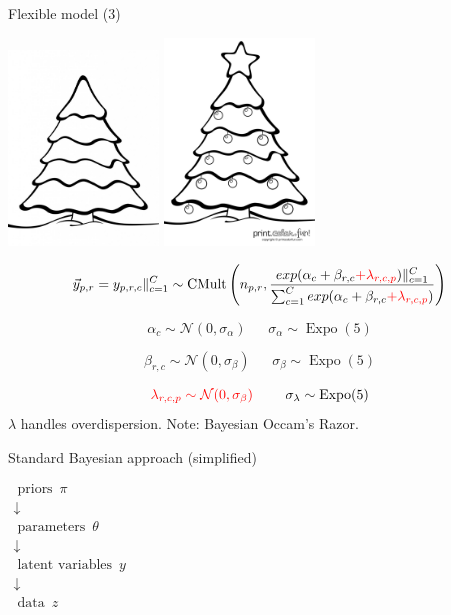 \documentclass[ignorenonframetext,]{beamer}
\newcommand{\red}[1]{\textcolor{red}{#1}}
\begin{document}
\begin{frame}{Flexible model (3)}

\includegraphics[width=0.30000\textwidth]{holidaytree_bare.jpg}
\includegraphics[width=0.30000\textwidth]{holidaytree_decorated.png}

\[\vec{y}_{p,r}=y_{p,r,c}\Vert_{c=1}^C\sim \operatorname{CMult}\left(n_{p,r},\frac{exp(\alpha_c+\beta_{r,c}\red{+\lambda_{r,c,p}})\Vert_{c=1}^C}{\sum_{c=1}^Cexp(\alpha_c+\beta_{r,c}\red{+\lambda_{r,c,p}})}\right)\]

\[\alpha_c\sim\mathcal{N}(0,\sigma_\alpha)~~~~~~~\sigma_\alpha\sim\operatorname{Expo}(5)\]

\[\beta_{r,c}\sim\mathcal{N}(0,\sigma_\beta)~~~~~~~\sigma_\beta\sim\operatorname{Expo}(5)\]

\[\red{\lambda_{r,c,p}\sim\mathcal{N}(0,\sigma_\beta)}~~~~~~~\sigma_\lambda\sim\operatorname{Expo}(5)\]
\(\lambda\) handles overdispersion. Note: Bayesian Occam's Razor.

\end{frame}

\begin{frame}{Standard Bayesian approach (simplified)}

\(\begin{array}{cl} \operatorname{priors}~\pi & \\ \downarrow & \\ \operatorname{parameters}~\theta & \\ \downarrow & \\ \operatorname{latent~variables}~y & \\ \downarrow & \\ \operatorname{data}~z & \end{array}\)

\end{frame}
\end{document}
